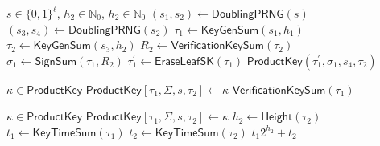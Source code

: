 \documentclass{article}
\begin{document}
\begin{algorithm}
\caption{$\mathsf{KeyGenProduct}: s,h_1,h_2 \to \mathsf{\hyperref[def:ProductKey]{ProductKey}}  $}\label{alg:KeyGenProduct}
\begin{algorithmic}[1]
\Require $s \in \{0,1\}^\ell$, $h_2\in \mathbb{N}_0$, $h_2\in \mathbb{N}_0$
\State $(s_1,s_2) \gets \mathsf{\hyperref[alg:DoublingPRNG]{DoublingPRNG}}(s)$
\State $(s_3,s_4) \gets \mathsf{\hyperref[alg:DoublingPRNG]{DoublingPRNG}}(s_2)$
\State $\tau_1 \gets \mathsf{\hyperref[alg:KeyGenSum]{KeyGenSum}}(s_1,h_1)$
\State $\tau_2 \gets \mathsf{\hyperref[alg:KeyGenSum]{KeyGenSum}}(s_3,h_2)$
\State $R_2\gets \mathsf{\hyperref[alg:VerificationKeySum]{VerificationKeySum}}(\tau_2)$
\State $\sigma_1 \gets \mathsf{\hyperref[alg:SignSum]{SignSum}}(\tau_1,R_2)$
\State $\tau^\prime_1\gets\mathsf{\hyperref[alg:EraseLeafSK]{EraseLeafSK}}(\tau_1)$
\State \Return $\mathsf{\hyperref[def:ProductKey]{ProductKey}}(\tau_1^\prime,\sigma_1,s_4,\tau_2)$
\end{algorithmic}
\end{algorithm}

\begin{algorithm}
\caption{$\mathsf{VerificationKeyProduct}:\kappa\to \{0,1\}^\ell  $}\label{alg:VerificationKeyProduct}
\begin{algorithmic}[1]
\Require $\kappa \in \mathsf{\hyperref[def:ProductKey]{ProductKey}}$
\State $\mathsf{\hyperref[def:ProductKey]{ProductKey}}[\tau_1,\Sigma,s,\tau_2]\gets \kappa$
\State \Return $\mathsf{\hyperref[alg:VerificationKeySum]{VerificationKeySum}}(\tau_1)$
\end{algorithmic}
\end{algorithm}

\begin{algorithm}
\caption{$\mathsf{KeyTimeProduct}: \kappa \to \mathbb{N}_0  $}\label{alg:KeyTimeProduct}
\begin{algorithmic}[1]
\Require $\kappa \in \mathsf{\hyperref[def:ProductKey]{ProductKey}}$
\State $\mathsf{\hyperref[def:ProductKey]{ProductKey}}[\tau_1,\Sigma,s,\tau_2]\gets \kappa$
\State $h_2\gets \mathsf{\hyperref[alg:Height]{Height}}(\tau_2)$
\State $t_1\gets \mathsf{\hyperref[alg:KeyTimeSum]{KeyTimeSum}}(\tau_1)$
\State $t_2\gets \mathsf{\hyperref[alg:KeyTimeSum]{KeyTimeSum}}(\tau_2)$
\State \Return $t_1 2^{h_2}+t_2$
\end{algorithmic}
\end{algorithm}
\end{document}
